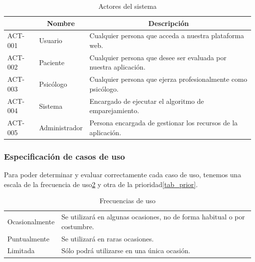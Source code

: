 \begin{table}[htpb]
\centering
\begin{tabularx}{\textwidth}{|l|X|X|}
\hline
\rowcolor[gray]{0.9}\multicolumn{1}{|c|}{\textbf{Identificador}} & \multicolumn{1}{c|}{\textbf{Nombre}} & \multicolumn{1}{c|}{\textbf{Descripción}}                                 \\ \hline
ACT-001                             & Usuario                     & Cualquier persona que acceda a nuestra plataforma web.           \\ \hline
ACT-002                             & Paciente                    & Cualquier persona que desee ser evaluada por nuestra aplicación. \\ \hline
ACT-003                             & Psicólogo                   & Cualquier persona que ejerza profesionalmente como psicólogo.    \\ \hline
ACT-004                             & Sistema                     & Encargado de ejecutar el algoritmo de emparejamiento.            \\ \hline
ACT-005                             & Administrador               & Persona encargada de gestionar los recursos de la aplicación.    \\ \hline
\end{tabularx}
\caption{Actores del sistema}
\label{tab_actores}
\end{table}


\subsubsection{Especificación de casos de uso}
Para poder determinar y evaluar correctamente cada caso de uso, tenemos una escala de la frecuencia de uso\ref{tab_frec_uso} y otra de la prioridad\ref{tab_prior}.

\begin{table}[htpb]
\centering
\begin{tabularx}{\textwidth}{|l|X|}
\hline
\rowcolor[gray]{0.9}\multicolumn{2}{|c|}{\textbf{Frecuencia de uso}}                                                   \\ \hline
Ocasionalmente & Se utilizará en algunas ocasiones, no de forma habitual o por costumbre. \\ \hline
Puntualmente   & Se utilizará en raras ocasiones.                                         \\ \hline
Limitada       & Sólo podrá utilizarse en una única ocasión.                              \\ \hline
\end{tabularx}
\caption{Frecuencias de uso}
\label{tab_frec_uso}
\end{table}

